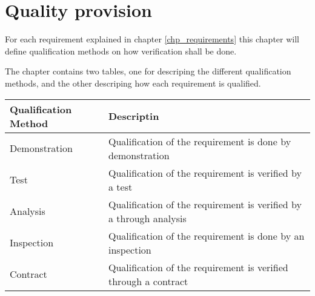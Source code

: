 \label{chp_qualityProvision}
\chapter{Quality provision}
For each requirement explained in chapter \ref{chp_requirements} this chapter will define qualification methods on how verification shall be done.

The chapter contains two tables, one for descriping the different qualification methods, and the other descriping how each requirement is qualified.

\begin{longtable}{| p{4.2cm}  | p{7.8cm} |  }
	\hline
	\textbf{Qualification Method}	& \textbf{Descriptin} \\ \hline
	Demonstration					& Qualification of the requirement is done by demonstration \\ \hline
	Test							& Qualification of the requirement is verified by a test\\ \hline
	Analysis						& Qualification of the requirement is verified by a through analysis \\ \hline
	Inspection						& Qualification of the requirement is done by an inspection \\ \hline
	Contract						& Qualification of the requirement is verified through a contract \\ \hline
\end{longtable}

